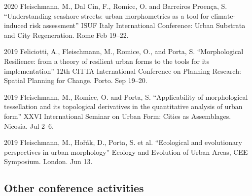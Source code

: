 \documentclass[12pt,a4paper]{report}
\begin{document}
\begin{tablist}
        \item[2020] \tab{}Fleischmann, M., Dal Cin, F., Romice, O. and Barreiros Proença, S. \enquote{Understanding seashore streets: urban morphometrics as a tool for climate-induced risk assessment} ISUF Italy International Conference: Urban Substrata and City Regeneration. Rome \@ Feb 19--22.

        \item[2019] \tab{}Feliciotti, A., Fleischmann, M., Romice, O., and Porta, S.  \enquote{Morphological Resilience: from a theory of resilient urban forms to the tools for its implementation} 12th CITTA International Conference on Planning Research: Spatial Planning for Change. Porto. \@ Sep 19--20.

        \item[2019] \tab{}Fleischmann, M., Romice, O. and Porta, S. \enquote{Applicability of morphological tessellation and its topological derivatives in the quantitative analysis of urban form} XXVI International Seminar on Urban Form: Cities as Assemblages. Nicosia. \@ Jul 2--6.

        \item[2019] \tab{}Fleischmann, M., Hořák, D., Porta, S. et al. \enquote{Ecological and evolutionary perspectives in urban morphology} Ecology and Evolution of Urban Areas, CEE Symposium. London. \@ Jun 13.


    \end{tablist}

    \subsection*{Other conference activities}
\end{document}
